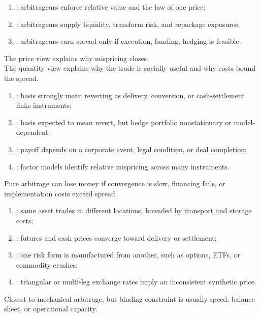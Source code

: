 \begin{taxonomy} 
\begin{enumerate}[label=\roman*.]
\setlength{\itemsep}{0pt}
\item {}: arbitrageurs enforce relative value and the law of one price;
\item {}: arbitrageurs supply liquidity, transform risk, and repackage exposures;
\item {}: arbitrageurs earn spread only if execution, funding, hedging is feasible.
\end{enumerate}
The price view explains why mispricing closes.\\
The quantity view explains why the trade is socially useful and why costs bound the spread.
\end{taxonomy}

\begin{taxonomy} 
\begin{enumerate}[label=\roman*.]
\setlength{\itemsep}{0pt}
\item {}: basis strongly mean reverting as delivery, conversion, or cash-settlement links instruments;
\item {}: basis expected to mean revert, but hedge portfolio nonstationary or model-dependent;
\item {}: payoff depends on a corporate event, legal condition, or deal completion;
\item {}: factor models identify relative mispricing across many instruments.
\end{enumerate}
Pure arbitrage can lose money if convergence is slow, financing fails, or implementation costs exceed spread.
\end{taxonomy}

\begin{taxonomy} 
\begin{enumerate}[label=\roman*.]
\setlength{\itemsep}{0pt}
\item {}: same asset trades in different locations, bounded by transport and storage costs;
\item {}: futures and cash prices converge toward delivery or settlement;
\item {}: one risk form is manufactured from another, such as options, ETFs, or commodity crushes;
\item {}: triangular or multi-leg exchange rates imply an inconsistent synthetic price.
\end{enumerate}
Closest to mechanical arbitrage, but binding constraint is usually speed, balance sheet, or operational capacity.
\end{taxonomy}

